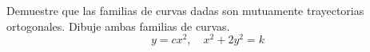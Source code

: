 \item Demuestre que las familias de curvas dadas son mutuamente trayectorias ortogonales. Dibuje ambas familias de curvas.
$$y = cx^2, \quad x^2 + 2y^2 = k$$
